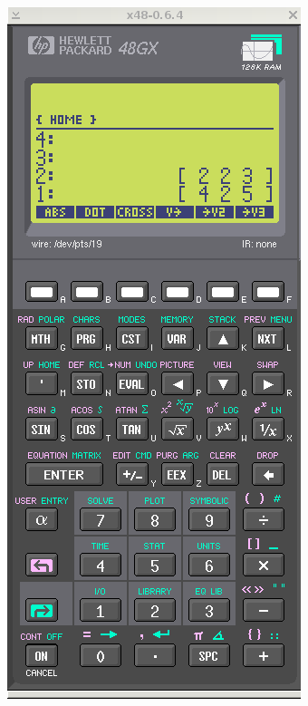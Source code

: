 \documentclass[11pt]{article}
\begin{document}
\includegraphics[scale,height=0.8\textheight]{20180422153058-cross-product02.png}
\end{document}
